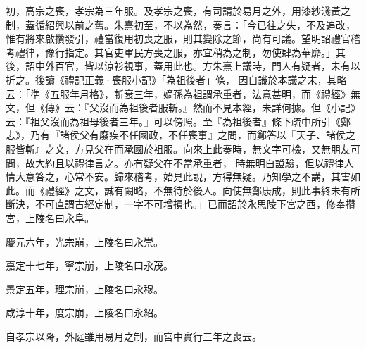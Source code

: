 \begin{pinyinscope}
 初，高宗之喪，孝宗為三年服。及孝宗之喪，有司請於易月之外，用漆紗淺黃之制，蓋循紹興以前之舊。朱熹初至，不以為然，奏言：「今已往之失，不及追改，惟有將來啟攢發引，禮當復用初喪之服，則其變除之節，尚有可議。望明詔禮官稽考禮律，豫行指定。其官吏軍民方喪之服，亦宜稍為之制，勿使肆為華靡。」其後，詔中外百官，皆以涼衫視事，蓋用此也。方朱熹上議時，門人有疑者，未有以折之。後讀《禮記正義·喪服小記》「為祖後者」條，
 因自識於本議之末，其略云：「準《五服年月格》，斬衰三年，嫡孫為祖謂承重者，法意甚明，而《禮經》無文，但《傳》云：『父沒而為祖後者服斬。』然而不見本經，未詳何據。但《小記》云：『祖父沒而為祖母後者三年。』可以傍照。至『為祖後者』條下疏中所引《鄭志》，乃有『諸侯父有廢疾不任國政，不任喪事』之問，而鄭答以『天子、諸侯之服皆斬』之文，方見父在而承國於祖服。向來上此奏時，無文字可檢，又無朋友可問，故大約且以禮律言之。亦有疑父在不當承重者，
 時無明白證驗，但以禮律人情大意答之，心常不安。歸來稽考，始見此說，方得無疑。乃知學之不講，其害如此。而《禮經》之文，誠有闕略，不無待於後人。向使無鄭康成，則此事終未有所斷決，不可直謂古經定制，一字不可增損也。」已而詔於永思陵下宮之西，修奉攢宮，上陵名曰永阜。



 慶元六年，光宗崩，上陵名曰永崇。



 嘉定十七年，寧宗崩，上陵名曰永茂。



 景定五年，理宗崩，上陵名曰永穆。



 咸淳十年，度宗崩，上陵名曰永紹。



 自孝宗以降，外庭雖用易月之制，而宮中實行三年之喪云。



\end{pinyinscope}